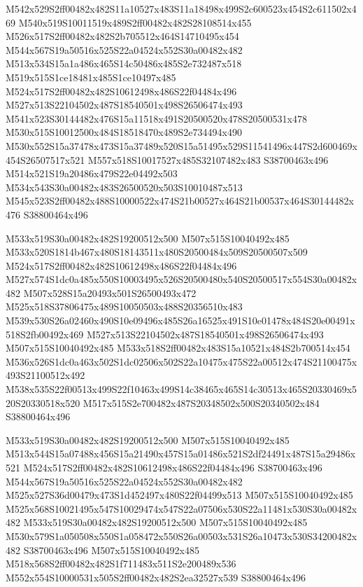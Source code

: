 \documentclass{article}
\begin{document}
\begin{multicols}{2}
M542x529S2ff00482x482S11a10527x483S11a18498x499S2c600523x454S2c611502x469 M540x519S10011519x489S2ff00482x482S28108514x455 M526x517S2ff00482x482S2b705512x464S14710495x454 M544x567S19a50516x525S22a04524x552S30a00482x482 M513x534S15a1a486x465S14c50486x485S2e732487x518 M519x515S1ce18481x485S1ce10497x485 M524x517S2ff00482x482S10612498x486S22f04484x496 M527x513S22104502x487S18540501x498S26506474x493 M541x523S30144482x476S15a11518x491S20500520x478S20500531x478 M530x515S10012500x484S18518470x489S2e734494x490 M530x552S15a37478x473S15a37489x520S15a51495x529S11541496x447S2d600469x454S26507517x521 M557x518S10017527x485S32107482x483 S38700463x496 M514x521S19a20486x479S22e04492x503 M534x543S30a00482x483S26500520x503S10010487x513 M545x523S2ff00482x488S10000522x474S21b00527x464S21b00537x464S30144482x476 S38800464x496

M533x519S30a00482x482S19200512x500 M507x515S10040492x485 M533x520S1814b467x480S18143511x480S20500484x509S20500507x509 M524x517S2ff00482x482S10612498x486S22f04484x496 M527x574S1dc0a485x550S10003495x526S20500480x540S20500517x554S30a00482x482 M507x528S15a20493x501S26500493x472 M525x518S37806475x489S10050503x488S20356510x483 M539x530S26a02460x490S10e09496x485S26a16525x491S10e01478x484S20e00491x518S2fb00492x469 M527x513S22104502x487S18540501x498S26506474x493 M507x515S10040492x485 M533x518S2ff00482x483S15a10521x484S2b700514x454 M536x526S1dc0a463x502S1dc02506x502S22a10475x475S22a00512x474S21100475x493S21100512x492 M538x535S22f00513x499S22f10463x499S14c38465x465S14c30513x465S20330469x520S20330518x520 M517x515S2e700482x487S20348502x500S20340502x484 S38800464x496

M533x519S30a00482x482S19200512x500 M507x515S10040492x485 M513x544S15a07488x456S15a21490x457S15a01486x521S2df24491x487S15a29486x521 M524x517S2ff00482x482S10612498x486S22f04484x496 S38700463x496 M544x567S19a50516x525S22a04524x552S30a00482x482 M525x527S36d00479x473S1d452497x480S22f04499x513 M507x515S10040492x485 M525x568S10021495x547S10029474x547S22a07506x530S22a11481x530S30a00482x482 M533x519S30a00482x482S19200512x500 M507x515S10040492x485 M530x579S1a050508x550S1a058472x550S26a00503x531S26a10473x530S34200482x482 S38700463x496 M507x515S10040492x485 M518x568S2ff00482x482S1f711483x511S2e200489x536 M552x554S10000531x505S2ff00482x482S2ea32527x539 S38800464x496


\end{multicols}
\end{document}
